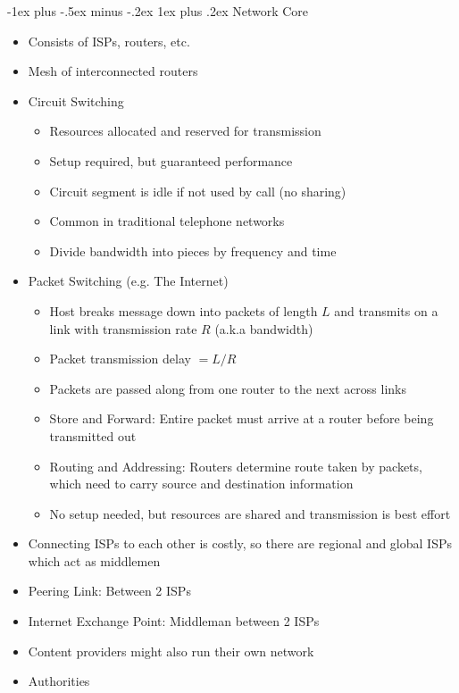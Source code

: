 \documentclass[10pt, landscape]{article}
\makeatletter
\renewcommand{\subsection}{\@startsection{subsection}{3}{0mm}%
                                {-1ex plus -.5ex minus -.2ex}%
                                {1ex plus .2ex}%
                                {\normalfont\small\bfseries}}%
\makeatother
\begin{document}
\begin{multicols*}{3}
\subsection{Network Core}
\begin{itemize}
    \item Consists of ISPs, routers, etc.
    \item Mesh of interconnected routers
    \item Circuit Switching
    \begin{itemize}
        \item Resources allocated and reserved for transmission
        \item Setup required, but guaranteed performance
        \item Circuit segment is idle if not used by call (no sharing)
        \item Common in traditional telephone networks
        \item Divide bandwidth into pieces by frequency and time
    \end{itemize}
    \item Packet Switching (e.g. The Internet)
    \begin{itemize}
        \item Host breaks message down into packets of length $L$ and transmits on a link with transmission rate $R$ (a.k.a bandwidth)
        \item Packet transmission delay $=L/R$
        \item Packets are passed along from one router to the next across links
        \item Store and Forward: Entire packet must arrive at a router before being transmitted out
        \item Routing and Addressing: Routers determine route taken by packets, which need to carry source and destination information
        \item No setup needed, but resources are shared and transmission is best effort
    \end{itemize}
    \item Connecting ISPs to each other is costly, so there are regional and global ISPs which act as middlemen
    \item Peering Link: Between 2 ISPs
    \item Internet Exchange Point: Middleman between 2 ISPs
    \item Content providers might also run their own network
    \item Authorities

\end{itemize}
\end{multicols*}
\end{document}
